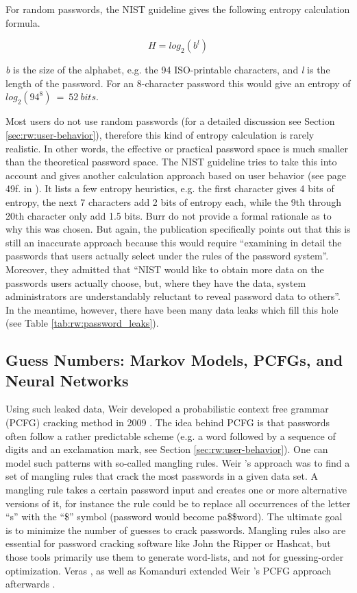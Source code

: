 	For random passwords, the \gls{NIST} guideline gives the following entropy calculation formula. 
	
	$$ H = log_2(b^l)$$
	
	\textit{b} is the size of the alphabet, e.g. the 94 ISO-printable characters, and \textit{l} is the length of the password. For an 8-character password this would give an entropy of $log_2(94^8)~=~52~bits$. 
	
	Most users do not use random passwords (for a detailed discussion see Section \ref{sec:rw:user-behavior}), therefore this kind of entropy calculation is rarely realistic. In other words, the effective or practical password space is much smaller than the theoretical password space. The \gls{NIST} guideline tries to take this into account and gives another calculation approach based on user behavior (see page 49f. in \cite{Burr2004NISTEntropy}). It lists a few entropy heuristics, e.g. the first character gives 4 bits of entropy, the next 7 characters add 2 bits of entropy each, while the 9th through 20th character only add 1.5 bits. Burr \etal do not provide a formal rationale as to why this was chosen. But again, the publication specifically points out that this is still an inaccurate approach because this would require ``examining in detail the passwords that users actually select under the rules of the password system''. Moreover, they admitted that ``NIST would like to obtain more data on the passwords users actually choose, but, where	they have the data, system administrators are understandably reluctant to reveal password	data to others''. In the meantime, however, there have been many data leaks which fill this hole (see Table \ref{tab:rw:password_leaks}).
	
	\subsection{Guess Numbers: Markov Models, PCFGs, and Neural Networks}
	
	Using such leaked data, Weir \etal developed a probabilistic context free grammar (PCFG) cracking method in 2009 \cite{Weir2009PCFG}. The idea behind PCFG is that passwords often follow a rather predictable scheme (e.g. a word followed by a sequence of digits and an exclamation mark, see Section \ref{sec:rw:user-behavior}). One can model such patterns with so-called mangling rules. Weir \etal's approach was to find a set of mangling rules that crack the most passwords in a given data set. A mangling rule takes a certain password input and creates one or more alternative versions of it, for instance the rule could be to replace all occurrences of the letter ``s'' with the ``\$'' symbol (password would become pa\$\$word). The ultimate goal is to minimize the number of guesses to crack passwords. Mangling rules also are essential for password cracking software like John the Ripper or Hashcat, but those tools primarily use them to generate word-lists, and not for guessing-order optimization. Veras \etal \cite{Veras2014SemanticPatterns}, as well as Komanduri extended Weir \etal's PCFG approach afterwards \cite{Komanduri2016Dissertation}.

